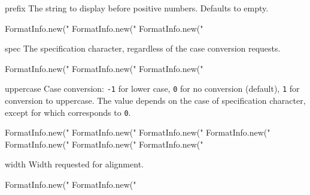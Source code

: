 \begin{urbiscriptapi}
\item[prefix]
  The string to display before positive numbers.  Defaults to empty.
\begin{urbiassert}
FormatInfo.new("%
FormatInfo.new("%
FormatInfo.new("%
\end{urbiassert}


\item[spec]
  The specification character, regardless of the case conversion
  requests.
\begin{urbiassert}
FormatInfo.new("%
FormatInfo.new("%
FormatInfo.new("%
\end{urbiassert}


\item[uppercase]
  Case conversion: \lstinline|-1| for lower case, \lstinline|0| for no
  conversion (default), \lstinline|1| for conversion to uppercase.
  The value depends on the case of specification character, except for
   which corresponds to \lstinline|0|.
\begin{urbiassert}
FormatInfo.new("%
FormatInfo.new("%
FormatInfo.new("%
FormatInfo.new("%
FormatInfo.new("%
FormatInfo.new("%
FormatInfo.new("%
\end{urbiassert}


\item[width]
  Width requested for alignment.
\begin{urbiassert}
FormatInfo.new("%
FormatInfo.new("%
\end{urbiassert}
\end{urbiscriptapi}

